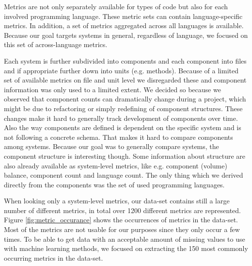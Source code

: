 Metrics are not only separately available for types of code but also for each involved programming language. These metric sets can contain language-specific metrics. In addition, a set of metrics aggregated across all languages is available. Because our goal targets systems in general, regardless of language, we focused on this set of across-language metrics.

Each system is further subdivided into components and each component into files and if appropriate further down into units (e.g. methods). Because of a limited set of available metrics on file and unit level we disregarded these and component information was only used to a limited extent. We decided so because we observed that component counts can dramatically change during a project, which might be due to refactoring or simply redefining of component structures. These changes make it hard to generally track development of components over time. Also the way components are defined is dependent on the specific system and is not following a concrete schema. That makes it hard to compare components among systems. Because our goal was to generally compare systems, the component structure is interesting though. Some information about structure are also already available as system-level metrics, like e.g. component (volume) balance, component count and language count. The only thing which we derived directly from the components was the set of used programming languages. 

When looking only a system-level metrics, our data-set contains still a large number of different metrics, in total over 1200 different metrics are represented. Figure \ref{fig:metric_occurance} shows the occurrences of metrics in the data-set. Most of the metrics are not usable for our purposes since they only occur a few times. To be able to get data with an acceptable amount of missing values to use with machine learning methods, we focused on extracting the 150 most commonly occurring metrics in the data-set.


